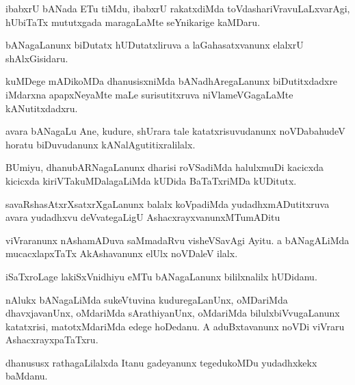 \documentclass{article}
\begin{document}
\begin{mn}%
ibabxrU bANada ETu tiMdu, ibabxrU rakatxdiMda toVdashariVravuLaLxvarAgi, hUbiTaTx 
mututxgada maragaLaMte seYnikarige kaMDaru.
\end{mn}

\begin{mn}%
bANagaLanunx biDutatx hUDutatxliruva a laGahasatxvanunx elalxrU shAlxGisidaru.
\end{mn}

\begin{mn}%
kuMDege mADikoMDa dhanusisxniMda bANadhAregaLanunx biDutitxdadxre iMdarxna apapxNeyaMte 
maLe surisutitxruva niVlameVGagaLaMte kANutitxdadxru.
\end{mn}

\begin{mn}%
avara bANagaLu Ane, kudure, shUrara tale katatxrisuvudanunx noVDabahudeV horatu 
biDuvudanunx kANalAgutitixralilalx.
\end{mn}

\begin{mn}%
BUmiyu, dhanubARNagaLanunx dharisi roVSadiMda halulxmuDi kacicxda kicicxda 
kiriVTakuMDalagaLiMda kUDida BaTaTxriMDa kUDitutx.
\end{mn}

\begin{mn}%
savaRshasAtxrXsatxrXgaLanunx balalx koVpadiMda yudadhxmADutitxruva avara yudadhxvu 
deVvategaLigU AshacxrayxvanunxMTumADitu
\end{mn}

\begin{mn}%
viVraranunx nAshamADuva saMmadaRvu visheVSavAgi Ayitu. a bANagALiMda mucacxlapxTaTx 
AkAshavanunx elUlx noVDaleV ilalx.
\end{mn}

\begin{mn}%
iSaTxroLage lakiSxVnidhiyu eMTu bANagaLanunx bililxnalilx hUDidanu.
\end{mn}

\begin{mn}%
nAlukx bANagaLiMda sukeVtuvina kuduregaLanUnx, oMDariMda dhavxjavanUnx, oMdariMda 
sArathiyanUnx, oMdariMda bilulxbiVvugaLanunx katatxrisi, matotxMdariMda edege hoDedanu. A 
aduBxtavanunx noVDi viVraru AshacxrayxpaTaTxru.
\end{mn}

\begin{mn}%
dhanususx rathagaLilalxda Itanu gadeyanunx tegedukoMDu yudadhxkekx baMdanu.
\end{mn}
\end{document}
